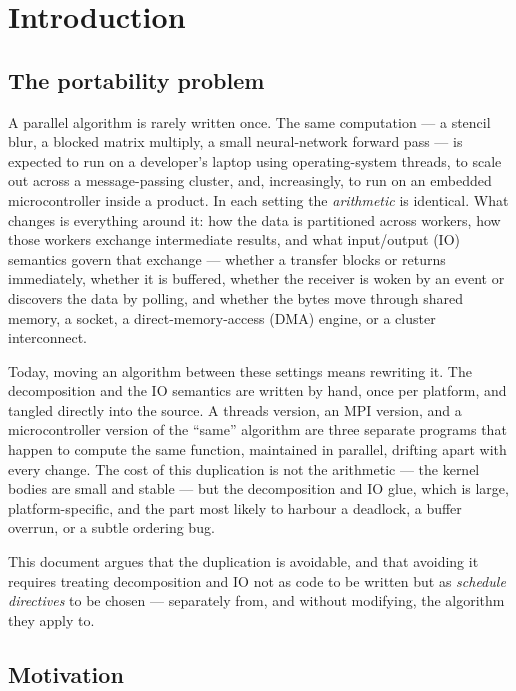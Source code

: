 \chapter{Introduction}\label{ch:introduction}

\section{The portability problem}\label{sec:intro-problem}

A parallel algorithm is rarely written once. The same computation --- a stencil
blur, a blocked matrix multiply, a small neural-network forward pass --- is
expected to run on a developer's laptop using operating-system threads, to scale
out across a message-passing cluster, and, increasingly, to run on an embedded
microcontroller inside a product. In each setting the \emph{arithmetic} is
identical. What changes is everything around it: how the data is partitioned
across workers, how those workers exchange intermediate results, and what
input/output (IO) semantics govern that exchange --- whether a transfer blocks
or returns immediately, whether it is buffered, whether the receiver is woken by
an event or discovers the data by polling, and whether the bytes move through
shared memory, a socket, a direct-memory-access (DMA) engine, or a cluster
interconnect.

Today, moving an algorithm between these settings means rewriting it. The
decomposition and the IO semantics are written by hand, once per platform, and
tangled directly into the source. A threads version, an MPI version, and a
microcontroller version of the ``same'' algorithm are three separate programs
that happen to compute the same function, maintained in parallel, drifting apart
with every change. The cost of this duplication is not the arithmetic --- the
kernel bodies are small and stable --- but the decomposition and IO glue, which
is large, platform-specific, and the part most likely to harbour a deadlock, a
buffer overrun, or a subtle ordering bug.

This document argues that the duplication is avoidable, and that avoiding it
requires treating decomposition and IO not as code to be written but as
\emph{schedule directives} to be chosen --- separately from, and without
modifying, the algorithm they apply to.

\section{Motivation}\label{sec:intro-motivation}

